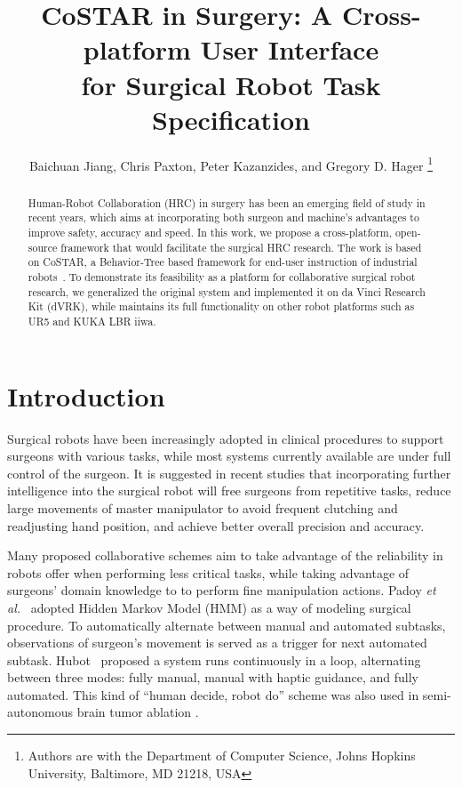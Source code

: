 \documentclass[letterpaper, 10 pt, conference]{ieeeconf}
\title{\huge \bf
CoSTAR in Surgery: A Cross-platform User Interface \\for Surgical Robot Task Specification
}
\author{Baichuan Jiang, Chris Paxton, Peter Kazanzides, and Gregory D. Hager
\thanks{Authors are with the Department of Computer Science, Johns Hopkins University,
        Baltimore, MD 21218, USA}
}
\begin{document}
\maketitle
\thispagestyle{empty}
\pagestyle{empty}


\newcommand{\fix}[1]{{\color{red} \textbf{[FIX: #1]}}}
\newcommand{\todo}[2]{{\color{blue} \textbf{[TODO(#1): #2]}}}

\begin{abstract}

Human-Robot Collaboration (HRC) in surgery has been an emerging field of study in recent years, which aims at incorporating both surgeon and machine's advantages to improve safety, accuracy and speed. In this work, we propose a cross-platform, open-source framework that would facilitate the surgical HRC research. The work is based on CoSTAR, a Behavior-Tree based framework for end-user instruction of industrial robots~\cite{paxton2017costar}. To demonstrate its feasibility as a platform for collaborative surgical robot research, we generalized the original system and implemented it on da Vinci Research Kit (dVRK), while maintains its full functionality on other robot platforms such as UR5 and KUKA LBR iiwa.  

\end{abstract}


\section{Introduction}

Surgical robots have been increasingly adopted in clinical procedures to support surgeons with various tasks, while most systems currently available are under full control of the surgeon. It is suggested in recent studies \cite{padoy2011human,berthet2016hubot,bauzano2016collaborative,hu2015semi} that incorporating further intelligence into the surgical robot will free surgeons from repetitive tasks, reduce large movements of master manipulator to avoid frequent clutching and readjusting hand position, and achieve better overall precision and accuracy. 

Many proposed collaborative schemes aim to take advantage of the reliability in robots offer when performing less critical tasks, while taking advantage of surgeons' domain knowledge to to perform fine manipulation actions. Padoy \textit{et al.}~\cite{padoy2011human} adopted Hidden Markov Model (HMM) as a way of modeling surgical procedure. To automatically alternate between manual and automated subtasks, observations of surgeon’s movement is served as a trigger for next automated subtask. Hubot~\cite{berthet2016hubot} proposed a system runs continuously in a loop, alternating between three modes: fully manual, manual with haptic guidance, and fully automated. This kind of ``human decide, robot do'' scheme was also used in semi-autonomous brain tumor ablation \cite{hu2015semi}.
\end{document}
